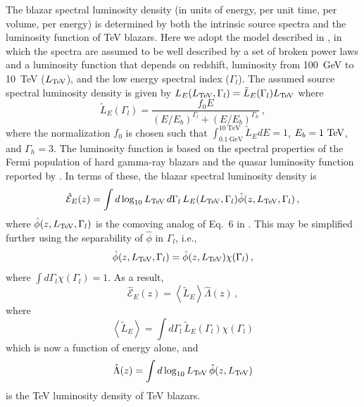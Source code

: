 \documentclass[numberedappendix]{emulateapj}
\begin{document}
The blazar spectral luminosity density (in units of energy, per unit time, per volume, per energy) is determined by both the
intrinsic source spectra and the luminosity function of TeV blazars.
Here we adopt the model described in \citet{2014ApJ...790..137B}, in
which the spectra are assumed to be well described by a set of broken
power laws and a luminosity function that depends on redshift,
luminosity from 100~GeV to 10~TeV ($L_{\rm TeV}$), and the low energy
spectral index ($\Gamma_l$).  The assumed source spectral luminosity
density is given by 
$L_E(L_{\rm TeV},\Gamma_l)=\tilde{L}_E(\Gamma_l) L_{\rm TeV}$ where
\begin{equation}
\label{eq:intrinsic_spectrum}
\tilde{L}_E(\Gamma_l) = \frac{f_0 E}{(E/E_b)^{\Gamma_l} + (E/E_b)^{\Gamma_h}}\,,
\end{equation}
where the normalization $f_0$ is chosen such that 
$\int_{0.1~\mathrm{GeV}}^{10~\mathrm{TeV}} \tilde{L}_E dE = 1$, $E_b=1~{\rm TeV}$, and
$\Gamma_h=3$.  The luminosity function is based on the spectral
properties of the Fermi population of hard gamma-ray blazars and the
quasar luminosity function reported by \citet{2007ApJ...654..731H}.
In terms of these, the blazar spectral luminosity density is
\begin{equation}\label{eq:spec_lum_dens}
\hat{\mathcal{E}}_E(z)
=
\int d\log_{10}L_{\rm TeV}\,d\Gamma_l\, L_E(L_{\rm TeV},\Gamma_l)
\hat{\phi}(z,L_{\rm TeV},\Gamma_l)\,,
\end{equation}
where $\hat{\phi}(z,L_{\rm TeV},\Gamma_l)$ is the comoving analog of Eq.~6 in \citet{2014ApJ...790..137B}.  This may be simplified
further using the separability of $\hat{\phi}$ in $\Gamma_l$, i.e.,
\begin{equation}
\hat{\phi}(z,L_{\rm TeV},\Gamma_l)
=
\hat{\phi}(z,L_{\rm TeV})
\chi(\Gamma_l)\,,
\end{equation}
where $\int d\Gamma_l \chi(\Gamma_l) = 1$.  As a result,
\begin{equation}
\label{eq:mean_heat}
\hat{\mathcal{E}}_E(z)
=
\left< \tilde{L}_E \right>
\hat{\Lambda}(z)\,,
\end{equation}
where
\begin{equation}
\left< \tilde{L}_E \right>
=
\int d\Gamma_l\,\tilde{L}_E(\Gamma_l) \chi(\Gamma_l)
\end{equation}
which is now a function of energy alone, and
\begin{equation}
\hat{\Lambda}(z) = 
\int d\log_{10}L_{\rm TeV}\,\hat{\phi}(z,L_{\rm TeV})
\end{equation}
is the TeV luminosity density of TeV blazars.  
\end{document}
